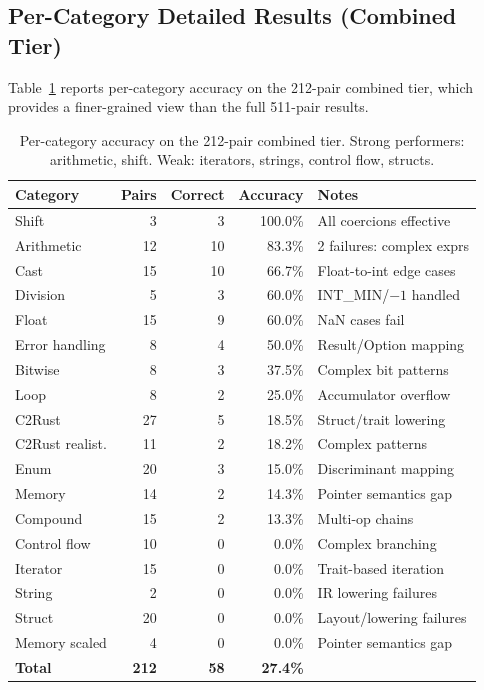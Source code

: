 \documentclass[10pt,a4paper]{article}
\begin{document}
\begin{appendices}
\subsection{Per-Category Detailed Results (Combined Tier)}

Table~\ref{tab:combined-detail} reports per-category accuracy on
the 212-pair combined tier, which provides a finer-grained view
than the full 511-pair results.

\begin{table}[h!]
\centering
\small
\caption{Per-category accuracy on the 212-pair combined tier.
Strong performers: arithmetic, shift.  Weak: iterators, strings,
control flow, structs.}
\label{tab:combined-detail}
\begin{tabular}{@{}lrrrl@{}}
\toprule
Category & Pairs & Correct & Accuracy & Notes \\
\midrule
Shift          & 3   & 3   & 100.0\% & All coercions effective \\
Arithmetic     & 12  & 10  & 83.3\%  & 2 failures: complex exprs \\
Cast           & 15  & 10  & 66.7\%  & Float-to-int edge cases \\
Division       & 5   & 3   & 60.0\%  & INT\_MIN/$-1$ handled \\
Float          & 15  & 9   & 60.0\%  & NaN cases fail \\
Error handling & 8   & 4   & 50.0\%  & Result/Option mapping \\
Bitwise        & 8   & 3   & 37.5\%  & Complex bit patterns \\
Loop           & 8   & 2   & 25.0\%  & Accumulator overflow \\
C2Rust         & 27  & 5   & 18.5\%  & Struct/trait lowering \\
C2Rust realist.& 11  & 2   & 18.2\%  & Complex patterns \\
Enum           & 20  & 3   & 15.0\%  & Discriminant mapping \\
Memory         & 14  & 2   & 14.3\%  & Pointer semantics gap \\
Compound       & 15  & 2   & 13.3\%  & Multi-op chains \\
Control flow   & 10  & 0   & 0.0\%   & Complex branching \\
Iterator       & 15  & 0   & 0.0\%   & Trait-based iteration \\
String         & 2   & 0   & 0.0\%   & IR lowering failures \\
Struct         & 20  & 0   & 0.0\%   & Layout/lowering failures \\
Memory scaled  & 4   & 0   & 0.0\%   & Pointer semantics gap \\
\midrule
\textbf{Total} & \textbf{212} & \textbf{58} & \textbf{27.4\%} & \\
\bottomrule
\end{tabular}
\end{table}


\end{appendices}
\end{document}
